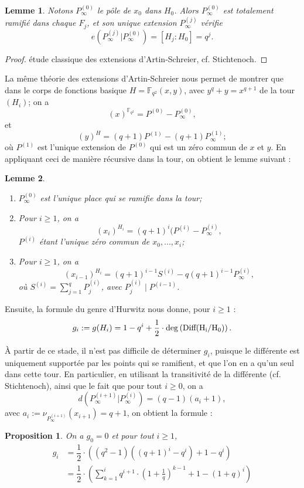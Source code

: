 \documentclass[10pt]{article}
\newtheorem{prop1}{Proposition}[]
\newtheorem{lem1}{Lemme}[]
\newcommand{\cd}{\cdot}
\begin{document}
\begin{lem1}
Notons $P_{\infty}^{(0)}$ le pôle de $x_0$ dans $H_0$. Alors $P_{\infty}^{(0)}$ est totalement ramifié dans chaque $F_j$, et son unique extension $P_{\infty}^{(j)}$ vérifie 
\[e(P_{\infty}^{(j)}|P_{\infty}^{(0)}) = [H_j:H_0]=q^j.\]
\end{lem1}

\begin{proof}
étude classique des extensions d'Artin-Schreier, cf. Stichtenoch.
\end{proof}

La même théorie des extensions d'Artin-Schreier nous permet de montrer que dans le corps de fonctions basique $H=\mathbb{F}_{q^2}(x,y)$, avec $y^q+y=x^{q+1}$ de la tour $(H_i)$; on a 
\[(x)^{\mathbb{F}_{q^2}} = P^{(0)} - P^{(0)}_{\infty},\]
et
\[(y)^H = (q+1)P^{(1)} - (q+1)P^{(1)}_{\infty};\]
où $P^{(1)}$ est l'unique extension de $P^{(0)}$ qui est un zéro commun de $x$ et $y$.
En appliquant ceci de manière récursive dans la tour, on obtient le lemme suivant :

\begin{lem1}
\begin{enumerate}
\item $P_{\infty}^{(0)}$ est l'unique place qui se ramifie dans la tour;
\item Pour $i \geq 1$, on a 
\[(x_i)^{H_i} = (q+1)^i (P^{(i)} - P_{\infty}^{(i)},\]
$P^{(i)}$ étant l'unique zéro commun de $x_0,...,x_i$;
\item Pour $i \geq 1$, on a 
\[(x_{i-1})^{H_i} = (q+1)^{i-1}S^{(i)} - q(q+1)^{i-1}P_{\infty}^{(i)},\]
où $S^{(i)} = \sum\limits_{j=1}^q P_j^{(i)}$, avec $P_j^{(i)} \mid P^{(i-1)}$.
\end{enumerate}
\end{lem1}

Ensuite, la formule du genre d'Hurwitz nous donne, pour $i \geq 1$ :
\[g_i := g(H_i) = 1-q^i + \dfrac{1}{2} \cd \rm{deg}\left(Diff(H_i/H_0)\right).\]

À partir de ce stade, il n'est pas difficile de déterminer $g_i$, puisque le différente est uniquement supportée par les points qui se ramifient, et que l'on en a qu'un seul dans cette tour. En particulier, en utilisant la transitivité de la différente (cf. Stichtenoch), ainsi que le fait que pour tout $i \geq 0$, on a 
\[d(P^{(i+1)}_{\infty} | P^{(i)}_{\infty}) = (q-1)(a_i+1),\]
avec $a_i := \nu_{P^{(i+1)}_{\infty}}(x_{i+1}) = q+1$, on obtient la formule :


\begin{prop1}
On a $g_0=0$ et pour tout $i\geq 1$,
\begin{align*}
g_i &= \dfrac{1}{2} \cd ((q^2-1)((q+1)^i-q^i)+1-q^i) \\
 &=\dfrac{1}{2} \cd \left(\sum\limits_{k=1}^i q^{i+1} \cd \left(1+\frac{1}{q}\right)^{k-1} +1 -(1+q)^i\right)
\end{align*}
\end{prop1}
\end{document}
